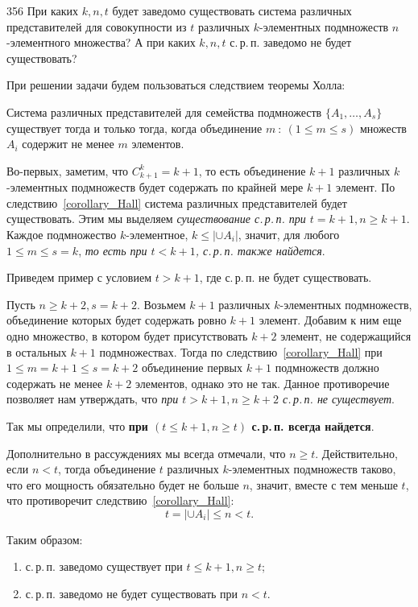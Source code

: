 \begin{task}{356}
При каких \(k,n,t\) будет заведомо существовать система различных представителей для совокупности из \(t\) различных \(k\)-элементных подмножеств \(n\)-элементного множества? А при каких \(k,n,t\) с.\,р.\,п. заведомо не будет существовать?
\end{task}

\begin{solution}

При решении задачи будем пользоваться следствием теоремы Холла:
\begin{corollary}\label{corollary_Hall}
Система различных представителей для семейства подмножеств \(\{A_1, \ldots, A_s\}\) существует тогда и только тогда, когда объединение \(m\::\:\left( 1 \leqslant m \leqslant s \right)\) множеств \(A_i\) содержит не менее \(m\) элементов.
\end{corollary}

Во-первых, заметим, что \(C_{k + 1}^{k} = k + 1\), то есть объединение \(k + 1\) различных \(k\)-элементных подмножеств будет содержать по крайней мере \(k + 1\) элемент. По следствию~\ref{corollary_Hall} система различных представителей будет существовать. Этим мы выделяем \emph{существование с.\,р.\,п. при \(t = k + 1, n \geqslant k + 1\)}. Каждое подмножество \(k\)-элементное, \(k \leqslant |\cup A_i|\), значит, для любого \(1 \leqslant m \leqslant s = k\), \emph{то есть при \(t < k + 1\), с.\,р.\,п. также найдется}.

Приведем пример с условием \(t > k + 1\), где с.\,р.\,п. не будет существовать.

Пусть \(n \geqslant k + 2, s = k + 2\). Возьмем \(k + 1\) различных \(k\)-элементных подмножеств, объединение которых будет содержать ровно \(k + 1\) элемент. Добавим к ним еще одно множество, в котором будет присутствовать \(k + 2\) элемент, не содержащийся в остальных \(k + 1\) подмножествах. Тогда по следствию~\ref{corollary_Hall} при \(1 \leqslant m = k + 1 \leqslant s = k + 2\) объединение первых \(k + 1\) подмножеств должно содержать не менее \(k + 2\) элементов, однако это не так. Данное противоречие позволяет нам утверждать, что \emph{при \(t > k + 1, n \geqslant k + 2\) с.\,р.\,п. не существует}.

Так мы определили, что \textbf{при \(\left(t \leqslant k + 1, n \geqslant t\right)\) с.\,р.\,п. всегда найдется}.

Дополнительно в рассуждениях мы всегда отмечали, что \(n \geqslant t\). Действительно, если \(n < t\), тогда объединение \(t\) различных \(k\)-элементных подмножеств таково, что его мощность обязательно будет не больше \(n\), значит, вместе с тем меньше \(t\), что противоречит следствию~\ref{corollary_Hall}:
\begin{equation*}
    t = |\cup A_i| \leqslant n < t.
\end{equation*}

Таким образом:
\begin{enumerate}
    \item с.\,р.\,п. заведомо существует при \(t \leqslant k + 1, n \geqslant t\);
    
    \item с.\,р.\,п. заведомо не будет существовать при \(n < t\).
\end{enumerate}

\end{solution}
